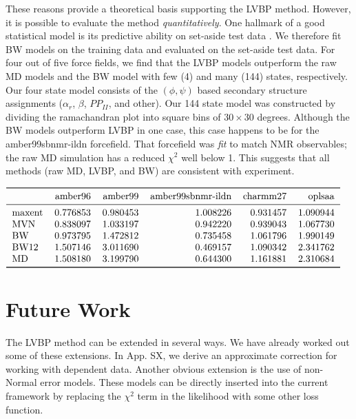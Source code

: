 \documentclass[journal=jacsat,manuscript=article]{achemso}
\begin{document}
These reasons provide a theoretical basis supporting the LVBP method.  However, it is possible to evaluate the method \emph{quantitatively}.  One hallmark of a good statistical model is its predictive ability on set-aside test data \cite{friedman2001elements}.  We therefore fit BW models on the training data and evaluated on the set-aside test data.  For four out of five force fields, we find that the LVBP models outperform the raw MD models and the BW model with few (4) and many (144) states, respectively.  Our four state model consists of the $(\phi, \psi)$ based secondary structure assignments \cite{Jha2005} ($\alpha_r$, $\beta$, $PP_{II}$, and other).  Our 144 state model was constructed by dividing the ramachandran plot into square bins of $30\times30$ degrees.  Although the BW models outperform LVBP in one case, this case happens to be for the amber99sbnmr-ildn forcefield.  That forcefield was \emph{fit} to match NMR observables; the raw MD simulation has a reduced $\chi^2$ well below 1.  This suggests that all 
methods (raw MD, LVBP, and BW) are consistent with experiment.  

\begin{math}
\begin{tabular}{lrrrrr}
\toprule
{} &   amber96 &   amber99 &  amber99sbnmr-ildn &  charmm27 &    oplsaa \\
\midrule
maxent &  0.776853 &  0.980453 &           1.008226 &  0.931457 &  1.090944 \\
MVN    &  0.838097 &  1.033197 &           0.942220 &  0.939043 &  1.067730 \\
BW     &  0.973795 &  1.472812 &           0.735458 &  1.061796 &  1.990149 \\
BW12   &  1.507146 &  3.011690 &           0.469157 &  1.090342 &  2.341762 \\
MD     &  1.508180 &  3.199790 &           0.644300 &  1.161881 &  2.310684 \\
\bottomrule
\end{tabular}
\end{math}

\section{Future Work}

The LVBP method can be extended in several ways.  We have already worked out some of these extensions.  In App. SX, we derive an approximate correction for working with dependent data.  Another obvious extension is the use of non-Normal error models.  These models can be directly inserted into the current framework by replacing the $\chi^2$ term in the likelihood with some other loss function.  
\end{document}
